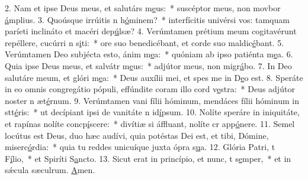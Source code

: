 2. Nam et ipse Deus meus, et salutárs m\uline{e}us:~* suscéptor meus, non movbor \uline{á}mplius.
3. Quoúsque irrúitis n h\uline{ó}minem?~* interfícitis univérsi vos: tamquam paríeti inclináto et macéri dep\uline{ú}lsæ?
4. Verúmtamen prétium meum cogitavérunt repéllere, cucúrri n s\uline{i}ti:~* ore suo benedicébant, et corde suo maldic\uline{é}bant.
5. Verúmtamen Deo subjécta esto, ánim m\uline{e}a:~* quóniam ab ipso patiénta m\uline{e}a.
6. Quia ipse Deus meus, et salvátr m\uline{e}us:~* adjútor meus, non migr\uline{á}bo.
7. In Deo salutáre meum, et glóri m\uline{e}a:~* Deus auxílii mei, et spes me in D\uline{e}o est.
8. Speráte in eo omnis congregátio pópuli, effúndite coram illo cord v\uline{e}stra:~* Deus adjútor noster n æt\uline{é}rnum.
9. Verúmtamen vani fílii hóminum, mendáces fílii hóminum in stt\uline{é}ris:~* ut decípiant ipsi de vanitáte n id\uline{í}psum.
10. Nolíte speráre in iniquitáte, et rapínas nolíte concp\uline{í}scere:~* divítiæ si áffluant, nolíte cr app\uline{ó}nere.
11. Semel locútus est Deus, duo hæc audívi, quia potéstas Dei est, et tibi, Dómine, miserc\uline{ó}rdia:~* quia tu reddes unicuíque juxta ópra s\uline{u}a.
12. Glória Patri, t F\uline{í}lio,~* et Spiríti S\uline{a}ncto.
13. Sicut erat in princípio, et nunc, t s\uline{e}mper,~* et in sǽcula sæculrum. \uline{A}men.
